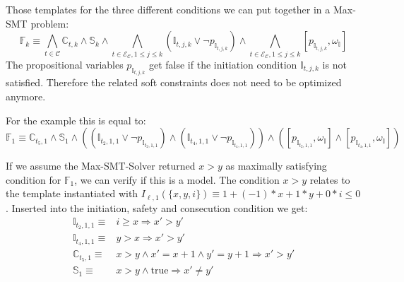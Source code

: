 Those templates for the three different conditions we can put together in a Max-SMT problem:
\[ \mathbb{F}_k \equiv \bigwedge_{t \in \mathcal{C}} \mathbb{C}_{t, k} \wedge \mathbb{S}_k \wedge \bigwedge_{t \in \mathcal{E}_\mathcal{C}, 1 \leq j \leq k}{(\mathbb{I}_{t,j,k} \vee \neg p_{\mathbb{I}_{t,j,k}})} \wedge \bigwedge_{t \in \mathcal{E}_\mathcal{C}, 1 \leq j \leq k}{[p_{\mathbb{I}_{t,j,k}}, \omega_\mathbb{I}]} \]
The propositional variables $p_{\mathbb{I}_{t,j,k}}$ get false if the initiation condition $\mathbb{I}_{t,j,k}$ is not satisfied.
Therefore the related soft constraints does not need to be optimized anymore.

For the example this is equal to:
\[ \mathbb{F}_1 \equiv \mathbb{C}_{t_5, 1} \wedge \mathbb{S}_1 \wedge ((\mathbb{I}_{t_2,1,1} \vee \neg p_{\mathbb{I}_{t_2,1,1}}) \wedge (\mathbb{I}_{t_4,1,1} \vee \neg p_{\mathbb{I}_{t_4,1,1}})) \wedge ([p_{\mathbb{I}_{t_2,1,1}}, \omega_\mathbb{I}] \wedge [p_{\mathbb{I}_{t_4,1,1}}, \omega_\mathbb{I}]) \]

If we assume the Max-SMT-Solver returned $x > y$ as maximally satisfying condition for $\mathbb{F}_1$, we can verify if this is a model.
The condition $x > y$ relates to the template instantiated with $I_{\ell,1}(\lbrace x, y, i \rbrace) \equiv 1 + (-1) * x + 1 * y + 0 * i \leq 0$.
Inserted into the initiation, safety and consecution condition we get:
\begin{align}
  \mathbb{I}_{t_2, 1, 1} \equiv & i \geq x \Rightarrow x' > y'\\
  \mathbb{I}_{t_4, 1, 1} \equiv & y > x \Rightarrow x' > y'\\
  \mathbb{C}_{t_5, 1} \equiv & x > y \wedge x' = x + 1 \wedge y' = y + 1 \Rightarrow x' > y'\\
  \mathbb{S}_1 \equiv & x > y \wedge \text{true} \Rightarrow x' \neq y'
\end{align}


